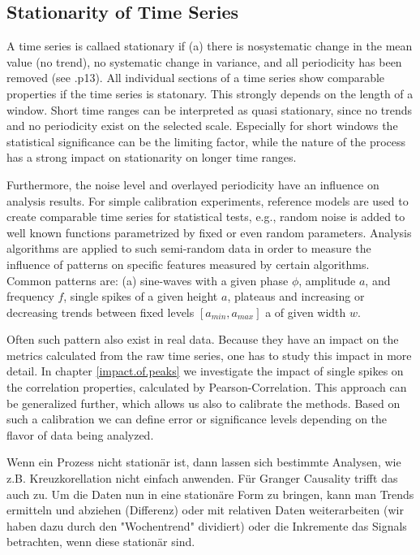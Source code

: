 \documentclass[a4paper,10pt]{scrbook}
\begin{document}
\subsection{Stationarity of Time Series}

A time series is callaed stationary if (a) there is nosystematic change in the mean value (no trend), no systematic change in variance, and all periodicity has been removed (see \cite{Chatfield2004} .p13). All individual sections of a time series show comparable properties if the time series is statonary. This strongly depends on the length of a window. Short time ranges can be interpreted as quasi stationary, since no trends and no periodicity exist on the selected scale. Especially for short windows the statistical significance can be the limiting factor, while the nature of the process has a strong impact on stationarity on longer time ranges.    

Furthermore, the noise level and overlayed periodicity have an influence on analysis results. For simple calibration experiments, reference models are used to create comparable time series for statistical tests, e.g., random noise is added to well known functions parametrized by fixed or even random parameters. Analysis algorithms are applied to such semi-random data in order to measure the influence of patterns on specific features measured by certain algorithms. Common patterns are: (a) sine-waves with a given phase $\phi$, amplitude $a$, and frequency $f$, single spikes of a given height $a$, plateaus and increasing or decreasing trends between fixed levels $[a_{min}, a_{max}]$ a of given width $w$. 

Often such pattern also exist in real data. Because they have an impact on the metrics calculated from the raw time series, one has to study this impact in more detail. In chapter \ref{impact.of.peaks} we investigate the impact of single spikes on the correlation properties, calculated by Pearson-Correlation. This approach can be generalized further, which allows us also to calibrate the methods. Based on such a calibration we can define error or significance levels depending on the flavor of data being analyzed. 

Wenn ein Prozess nicht stationär ist, dann lassen sich bestimmte Analysen,
wie z.B. Kreuzkorellation nicht einfach anwenden. Für Granger Causality
trifft das auch zu. Um die Daten nun in eine stationäre Form zu bringen,
kann man Trends ermitteln und abziehen (Differenz) oder mit relativen Daten
weiterarbeiten (wir haben dazu durch den "Wochentrend" dividiert) oder die
Inkremente das Signals betrachten, wenn diese stationär sind.
\end{document}
